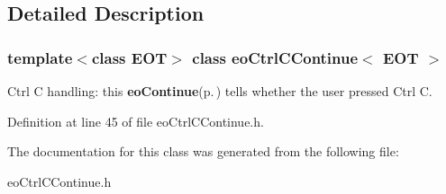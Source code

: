 \subsection{Detailed Description}
\subsubsection*{template$<$class EOT$>$ class eo\-Ctrl\-CContinue$<$ EOT $>$}

Ctrl C handling: this {\bf eo\-Continue}{\rm (p.\,\pageref{classeo_continue})} tells whether the user pressed Ctrl C. 



Definition at line 45 of file eo\-Ctrl\-CContinue.h.

The documentation for this class was generated from the following file:\begin{CompactItemize}
\item 
eo\-Ctrl\-CContinue.h\end{CompactItemize}
